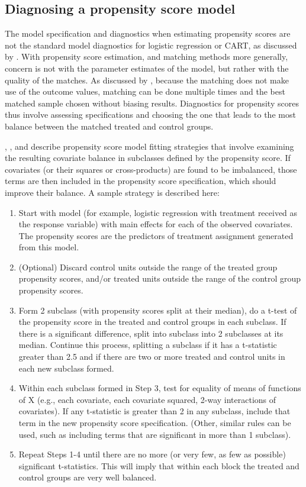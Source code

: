 \documentclass[oneside,letterpaper,titlepage]{article}
\begin{document}
\subsection{Diagnosing a propensity score model}
\label{pscorespec}
The model specification and diagnostics when estimating propensity
scores are not the standard model diagnostics for logistic regression
or CART, as discussed by \cite{Rubin04}.  With propensity score
estimation, and matching methods more generally, concern is not with
the parameter estimates of the model, but rather with the quality of
the matches.  As discussed by \cite{Greevy04}, because the matching
does not make use of the outcome values, matching can be done multiple
times and the best matched sample chosen without biasing results.
Diagnostics for propensity scores thus involve assessing
specifications and choosing the one that leads to the most balance
between the matched treated and control groups.

\cite{RosRub84a}, \cite{Perkins00}, and \cite{DehWah02} describe
propensity score model fitting strategies that involve examining the
resulting covariate balance in subclasses defined by the propensity
score.  If covariates (or their squares or cross-products) are found
to be imbalanced, those terms are then included in the propensity
score specification, which should improve their balance.  A sample
strategy is described here:

\begin{enumerate}
\item Start with model (for example, logistic regression with
  treatment received as the response variable) with main effects for
  each of the observed covariates.  The propensity scores are the
  predictors of treatment assignment generated from this model.
\item (Optional) Discard control units outside the range of the
  treated group propensity scores, and/or treated units outside the
  range of the control group propensity scores.
\item Form 2 subclass (with propensity scores split at their median),
  do a t-test of the propensity score in the treated and control
  groups in each subclass.  If there is a significant difference,
  split into subclass into 2 subclasses at its median.  Continue this
  process, splitting a subclass if it has a t-statistic greater than
  2.5 and if there are two or more treated and control units in each
  new subclass formed.
\item Within each subclass formed in Step 3, test for equality of
  means of functions of X (e.g., each covariate, each covariate
  squared, 2-way interactions of covariates).  If any t-statistic is
  greater than 2 in any subclass, include that term in the new
  propensity score specification.  (Other, similar rules can be used,
  such as including terms that are significant in more than 1
  subclass).
\item Repeat Steps 1-4 until there are no more (or very few, as few as
  possible) significant t-statistics.  This will imply that within
  each block the treated and control groups are very well balanced.
\end{enumerate}
\end{document}
